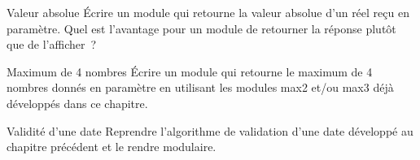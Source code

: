 \begin{Exercice}{Valeur absolue}
Écrire un module qui retourne la valeur absolue d’un
réel reçu en paramètre.
Quel est l’avantage pour un module de retourner la réponse 
plutôt que de l’afficher~?
\end{Exercice}

\begin{Exercice}{Maximum de 4 nombres}
Écrire un module qui retourne le maximum de 4
nombres donnés en paramètre en utilisant les modules
max2 et/ou max3 déjà développés dans ce chapitre.
\end{Exercice}

\begin{Exercice}{Validité d’une date}
Reprendre l’algorithme de validation d’une date 
développé au chapitre précédent et le rendre modulaire.
\end{Exercice}

